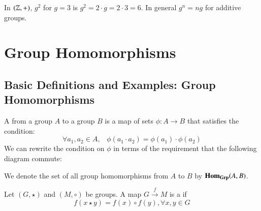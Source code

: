 \documentclass[12pt, a4paper, oneside, openright, titlepage]{book}
\begin{document}
\begin{eg}
    In $(\mathbb Z,+)$, $g^2$ for $g = 3$ is $g^2 = 2\cdot g = 2\cdot 3 = 6$. In general $g^n = ng$ for additive groups.
\end{eg}




\chapter{\textsection\textsection Group Homomorphisms}

\section{\textsection Basic Definitions and Examples: Group Homomorphisms}

\begin{defn}[A]
    A  from a group $A$ to a group $B$ is a map of sets $\phi:A\rightarrow B$ that satisfies the condition: \begin{equation}
        \forall a_1,a_2\in A,\;\;\;\phi(a_1\cdot a_2) = \phi(a_1)\cdot \phi(a_2)
    \end{equation}
    We can rewrite the condition on $\phi$ in terms of the requirement that the following diagram commute: \begin{center}
        \end{center}
        We denote the set of all group homomorphisms from $A$ to $B$ by $\mathbf{Hom}_{\normalfont\textbf{Grp}}(A,B)$.
\end{defn}


\begin{defn}[B]
    Let $(G,\star)$ and $(M,\circ)$ be groups. A map $G\xrightarrow{f} M$ is a  if \begin{equation}
        f(x\star y) = f(x)\circ f(y),\forall x,y \in G
    \end{equation} 
\end{defn}
\end{document}
